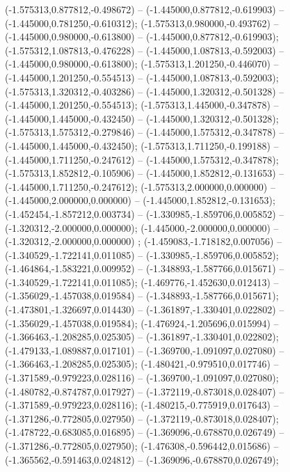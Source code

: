  (-1.575313,0.877812,-0.498672) -- (-1.445000,0.877812,-0.619903) -- (-1.445000,0.781250,-0.610312);
 (-1.575313,0.980000,-0.493762) -- (-1.445000,0.980000,-0.613800) -- (-1.445000,0.877812,-0.619903);
 (-1.575312,1.087813,-0.476228) -- (-1.445000,1.087813,-0.592003) -- (-1.445000,0.980000,-0.613800);
 (-1.575313,1.201250,-0.446070) -- (-1.445000,1.201250,-0.554513) -- (-1.445000,1.087813,-0.592003);
 (-1.575313,1.320312,-0.403286) -- (-1.445000,1.320312,-0.501328) -- (-1.445000,1.201250,-0.554513);
 (-1.575313,1.445000,-0.347878) -- (-1.445000,1.445000,-0.432450) -- (-1.445000,1.320312,-0.501328);
 (-1.575313,1.575312,-0.279846) -- (-1.445000,1.575312,-0.347878) -- (-1.445000,1.445000,-0.432450);
 (-1.575313,1.711250,-0.199188) -- (-1.445000,1.711250,-0.247612) -- (-1.445000,1.575312,-0.347878);
 (-1.575313,1.852812,-0.105906) -- (-1.445000,1.852812,-0.131653) -- (-1.445000,1.711250,-0.247612);
 (-1.575313,2.000000,0.000000) -- (-1.445000,2.000000,0.000000) -- (-1.445000,1.852812,-0.131653);
 (-1.452454,-1.857212,0.003734) -- (-1.330985,-1.859706,0.005852) -- (-1.320312,-2.000000,0.000000);
 (-1.445000,-2.000000,0.000000) -- (-1.320312,-2.000000,0.000000) ;
 (-1.459083,-1.718182,0.007056) -- (-1.340529,-1.722141,0.011085) -- (-1.330985,-1.859706,0.005852);
 (-1.464864,-1.583221,0.009952) -- (-1.348893,-1.587766,0.015671) -- (-1.340529,-1.722141,0.011085);
 (-1.469776,-1.452630,0.012413) -- (-1.356029,-1.457038,0.019584) -- (-1.348893,-1.587766,0.015671);
 (-1.473801,-1.326697,0.014430) -- (-1.361897,-1.330401,0.022802) -- (-1.356029,-1.457038,0.019584);
 (-1.476924,-1.205696,0.015994) -- (-1.366463,-1.208285,0.025305) -- (-1.361897,-1.330401,0.022802);
 (-1.479133,-1.089887,0.017101) -- (-1.369700,-1.091097,0.027080) -- (-1.366463,-1.208285,0.025305);
 (-1.480421,-0.979510,0.017746) -- (-1.371589,-0.979223,0.028116) -- (-1.369700,-1.091097,0.027080);
 (-1.480782,-0.874787,0.017927) -- (-1.372119,-0.873018,0.028407) -- (-1.371589,-0.979223,0.028116);
 (-1.480215,-0.775919,0.017643) -- (-1.371286,-0.772805,0.027950) -- (-1.372119,-0.873018,0.028407);
 (-1.478722,-0.683085,0.016895) -- (-1.369096,-0.678870,0.026749) -- (-1.371286,-0.772805,0.027950);
 (-1.476308,-0.596442,0.015686) -- (-1.365562,-0.591463,0.024812) -- (-1.369096,-0.678870,0.026749);
